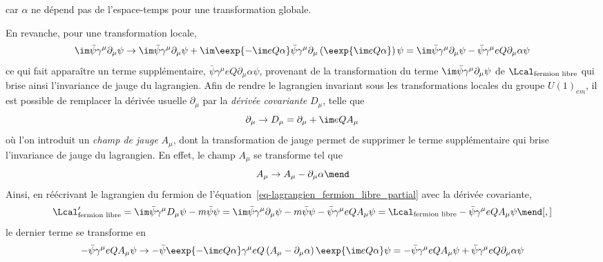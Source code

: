 car $\alpha$ ne dépend pas de l'espace-temps pour une transformation globale.
\par En revanche, pour une transformation locale, %
\begin{equation}
\im\bar{\psi} \gamma^\mu\partial_\mu \psi
\to
\im\bar{\psi} \gamma^\mu\partial_\mu \psi
+
\im\eexp{-\im eQ\alpha}
\bar{\psi}
\gamma^\mu
\partial_\mu
\left(\eexp{\im eQ\alpha}\vphantom{\psi\eexp{\im eQ\alpha}}\right)
\psi
=
\im\bar{\psi} \gamma^\mu\partial_\mu \psi
-
\bar{\psi}
\gamma^\mu
eQ\partial_\mu
\alpha
\psi
\label{eq-QED_jauge_brisee}
\end{equation}
ce qui fait apparaître un terme supplémentaire, $\bar{\psi}\gamma^\mu eQ\partial_\mu\alpha\psi$, provenant de la transformation du terme $\im \bar{\psi} \gamma^\mu\partial_\mu \psi$ de $\Lcal_{\text{fermion libre}}$ qui brise ainsi l'invariance de jauge du lagrangien.
Afin de rendre le lagrangien invariant sous les transformations locales du groupe $U(1)_{em}$, il est possible de remplacer la dérivée usuelle $\partial_\mu$ par la \emph{dérivée covariante} $D_\mu$, telle que
\begin{equation}
\partial_\mu \to D_\mu = \partial_\mu + \im eQ A_\mu
\end{equation}
où l'on introduit un \emph{champ de jauge} $A_\mu$, dont la transformation de jauge permet de supprimer le terme supplémentaire qui brise l'invariance de jauge du lagrangien. En effet, le champ $A_\mu$ se transforme tel que
\begin{equation}
A_\mu \to A_\mu - \partial_\mu\alpha
\mend
\end{equation}
Ainsi, en réécrivant le lagrangien du fermion de l'équation~\eqref{eq-lagrangien_fermion_libre_partial} avec la dérivée covariante,
\begin{equation}
\Lcal_{\text{fermion libre}}' = \im \bar{\psi} \gamma^\mu D_\mu \psi - m \bar{\psi}\psi
= \im \bar{\psi} \gamma^\mu\partial_\mu \psi - m \bar{\psi}\psi - \bar{\psi}\gamma^\mu eQA_\mu \psi
= \Lcal_{\text{fermion libre}} - \bar{\psi}\gamma^\mu eQA_\mu \psi
\mend[,]
\end{equation}
le dernier terme se transforme en
\begin{equation}
-\bar{\psi}\gamma^\mu eQA_\mu \psi
\to
-\bar{\psi}\eexp{-\im eQ\alpha}
\gamma^\mu
eQ\left(A_\mu - \partial_\mu\alpha\right)
\eexp{\im eQ\alpha}\psi
=
-\bar{\psi} \gamma^\mu eQA_\mu \psi
+
\bar{\psi} \gamma^\mu eQ \partial_\mu\alpha \psi
\end{equation}
